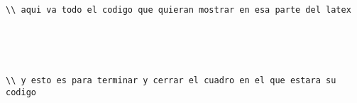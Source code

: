 \begin{lstlisting}[language="lenguaje que ocupen en ese caso"]
\\ aqui va todo el codigo que quieran mostrar en esa parte del latex





\\ y esto es para terminar y cerrar el cuadro en el que estara su codigo
\end{lstlisting}